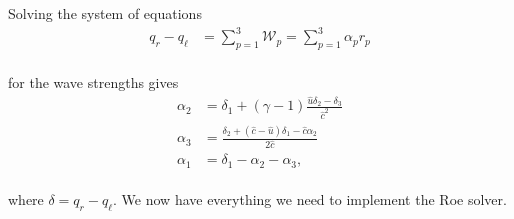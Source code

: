 \documentclass{SIAMbook2016}
\begin{document}
Solving the system of equations \begin{align}
q_r - q_\ell & = \sum_{p=1}^3 {\mathcal W}_p = \sum_{p=1}^3 \alpha_p r_p
\end{align}\\
for the wave strengths gives \begin{align}
    \alpha_2 & = \delta_1 + (\gamma-1)\frac{\hat{u}\delta_2 - \delta_3}{\hat{c}^2} \\
    \alpha_3 & = \frac{\delta_2 + (\hat{c}-\hat{u})\delta_1 - \hat{c}\alpha_2}{2\hat{c}} \\
    \alpha_1 & = \delta_1 - \alpha_2 - \alpha_3,
\end{align}\\
where \(\delta = q_r - q_\ell\). We now have everything we need to
implement the Roe solver.
\end{document}
